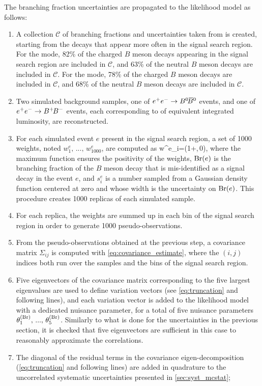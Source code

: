 The branching fraction uncertainties are propagated to the likelihood model as follows:
\begin{enumerate}
\item A collection $\mathcal{C}$ of branching fractions and uncertainties taken from \cite{ParticleDataGroup:2020ssz} is created, starting from the decays that appear more often in the signal search region.
For the \BKpnn mode, 82\% of the charged $B$ meson decays appearing in the signal search region are included in $\mathcal{C}$, and 63\% of the neutral $B$ meson decays are included in $\mathcal{C}$.
For the \BKznn mode, 78\% of the charged $B$ meson decays are included in $\mathcal{C}$, and 68\% of the neutral $B$ meson decays are included in $\mathcal{C}$.
\item Two simulated background samples, one of $\epem\to\BzBzb$ events, and one of $e^+e^-\rightarrow B^+ {\kern -0.16em B^-}$ events, each corresponding to \lumimctest of equivalent integrated luminosity, are reconstructed.
\item For each simulated event $e$ present in the signal search region, a set of 1000 weights, noted $w^e_1,\,...,\,w^e_{1000}$, are computed as
\be
w^e_i=\max\left(1+,\,0\right),
\ee
where the maximum function ensures the positivity of the weights, $\mathrm{\mathrm{Br}}(e)$ is the branching fraction of the $B$ meson decay that is mis-identified as a signal decay in the event $e$, and $s^e_i$ is a number sampled from a Gaussian density function centered at zero and whose width is the uncertainty on $\mathrm{\mathrm{Br}}(e)$.
This procedure creates 1000 replicas of each simulated sample.
\item For each replica, the weights are summed up in each bin of the signal search region in order to generate 1000 pseudo-observations.
\item From the pseudo-observations obtained at the previous step, a covariance matrix $\Sigma_{ij}$ is computed with \cref{eq:covariance_estimate}, where the $(i,j)$ indices both run over the samples and the bins of the signal search region.
\item Five eigenvectors of the covariance matrix corresponding to the five largest eigenvalues are used to define variation vectors (see \cref{eq:truncation} and following lines), and each variation vector is added to the likelihood model with a dedicated nuisance parameter, for a total of five nuisance parameters $\theta_1^{(\mathrm{\mathrm{Br}})},\,...,\,\theta_5^{(\mathrm{\mathrm{Br}})}$.
Similarly to what is done for the \PID uncertainties in the previous section, it is checked that five eigenvectors are sufficient in this case to reasonably approximate the correlations.
\item The diagonal of the residual terms in the covariance eigen-decomposition (\cref{eq:truncation} and following lines) are added in quadrature to the uncorrelated systematic uncertainties presented in \cref{sec:syst_mcstat};
\end{enumerate}

